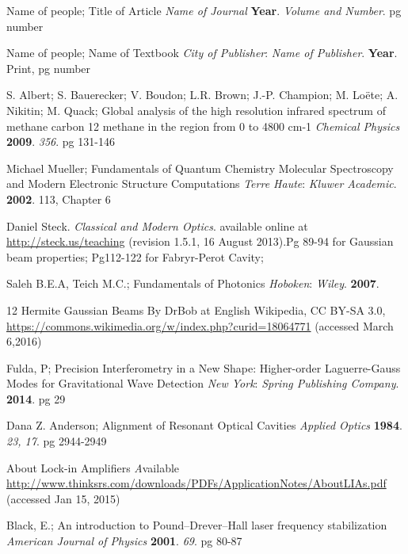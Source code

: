 \begin{thebibliography}{9}
		Name of people;
		Title of Article
		\textit{Name of Journal}
		\textbf{Year}.
		\textit{Volume and Number}.
		pg number
	
	
		Name of people;
		Name of Textbook
		\textit{City of Publisher}:
		\textit{Name of Publisher}.
		\textbf{Year}.
		Print,
		pg number
	
		S. Albert; S. Bauerecker; V. Boudon; L.R. Brown; J.-P. Champion; M. Loëte; A. Nikitin; M. Quack;
		Global analysis of the high resolution infrared spectrum of methane carbon 12
		methane in the region from 0 to 4800 cm-1
		\textit{Chemical Physics}
		\textbf{2009}.
		\textit{356}.
		pg 131-146	
	
	
		Michael Mueller;
		Fundamentals of Quantum Chemistry Molecular Spectroscopy and Modern Electronic Structure Computations
		\textit{Terre Haute}:
		\textit{Kluwer Academic}.
		\textbf{2002}.
		113, Chapter 6
	
	
		Daniel Steck. 
		\textit{Classical and Modern Optics}. 
		available online at \url{http://steck.us/teaching} (revision
		1.5.1, 16 August 2013).Pg 89-94 for Gaussian beam properties; Pg112-122 for Fabryr-Perot Cavity;
		
		Saleh B.E.A, Teich M.C.;
		Fundamentals of Photonics
		\textit{Hoboken}:
		\textit{Wiley}.
		\textbf{2007}.
		
	
		12 Hermite Gaussian Beams	
		By DrBob at English Wikipedia, CC BY-SA 3.0, \url{https://commons.wikimedia.org/w/index.php?curid=18064771}
		(accessed March 6,2016)
		
	
		Fulda, P;
		Precision Interferometry in a New Shape: Higher-order Laguerre-Gauss Modes for Gravitational Wave Detection
		\textit{New York}:
		\textit{Spring Publishing Company}.
		\textbf{2014}.
		pg 29		
		
	
		Dana Z. Anderson;
		Alignment of Resonant Optical Cavities
		\textit{Applied Optics}
		\textbf{1984}.
		\textit{23, 17}.
		pg 2944-2949
		
	
		About Lock-in Amplifiers
		\textit
		Available \url{http://www.thinksrs.com/downloads/PDFs/ApplicationNotes/AboutLIAs.pdf}
		(accessed Jan 15, 2015)
		
		
		Black, E.;
		An introduction to Pound–Drever–Hall laser frequency stabilization
		\textit{American Journal of Physics}
		\textbf{2001}.
		\textit{69}.
		pg 80-87
		

\end{thebibliography}
